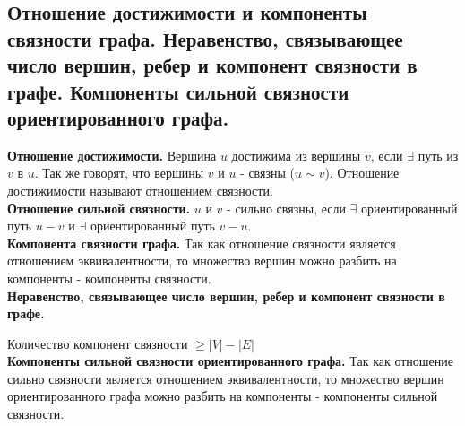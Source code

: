 \subsection{Отношение достижимости и компоненты связности графа. Неравенство, связывающее число вершин, ребер и компонент связности в графе. Компоненты сильной связности ориентированного графа.}
\textbf{Отношение достижимости.} Вершина $u$ достижима из вершины $v$, если $\exists$ путь из $v$ в $u$. Так же говорят,
что вершины $v$ и $u$ - связны ($u \sim v$). Отношение достижимости называют отношением связности.\\

\textbf{Отношение сильной связности.} $u$ и $v$ - сильно связны, если $\exists$ ориентированный путь $u - v$
и $\exists$ ориентированный путь $v - u$.\\

\textbf{Компонента связности графа.} Так как отношение связности является отношением эквивалентности, то множество вершин
можно разбить на компоненты - компоненты связности.\\

\textbf{Неравенство, связывающее число вершин, ребер и компонент связности в графе.}

Количество компонент связности $\geq |V| - |E|$\\

\textbf{Компоненты сильной связности ориентированного графа.} Так как отношение сильно связности является отношением эквивалентности,
то множество вершин ориентированного графа можно разбить на компоненты - компоненты сильной связности.
